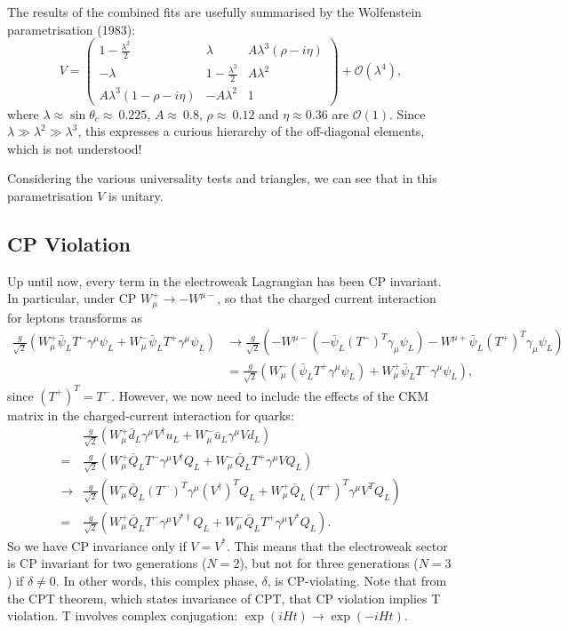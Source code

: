 The results of the combined fits are usefully summarised by the Wolfenstein parametrisation (1983):
\begin{equation}
V = \begin{pmatrix}
1-\frac{\lambda^2}{2} & \lambda & A\lambda^3(\rho - i\eta) \\
-\lambda &  1-\frac{\lambda^2}{2} & A \lambda^2\\
A\lambda^3(1-\rho-i\eta) & -A\lambda^2 & 1 
\end{pmatrix} + \mathcal{O}(\lambda^4),
\end{equation}
where $\lambda \approx \sin\theta_c \approx\ 0.225$, $A \approx\ 0.8$, $\rho \approx\ 0.12$ and $\eta \approx 0.36$ are $\mathcal{O}(1)$. Since $\lambda \gg \lambda^2 \gg \lambda^3$, this expresses a curious hierarchy of the off-diagonal elements, which is not understood! 

Considering the various universality tests and triangles, we can see that in this parametrisation $V$ is unitary.
%
\subsection{CP Violation}
%
Up until now, every term in the electroweak Lagrangian has been CP invariant. In particular, under CP $W_\mu^+ \to - W^{\mu -}$, so that the charged current interaction for leptons transforms as 
\begin{equation}
\begin{split}
\frac{g}{\sqrt{2}}(W_\mu^+\bar{\psi}_LT^-\gamma^\mu \psi_L + W_\mu^-\bar{\psi}_L T^+ \gamma^\mu \psi_L) &\to \frac{g}{\sqrt{2}}(-W^{\mu -}(-\bar{\psi}_L(T^-)^T \gamma_\mu \psi_L) - W^{\mu +}\bar{\psi}_L(T^+)^T \gamma_\mu \psi_L) \\
&= \frac{g}{\sqrt{2}}(W_\mu^- (\bar{\psi}_L T^+ \gamma^\mu \psi_L) + W_\mu^+ \bar{\psi}_L T^- \gamma^\mu \psi_L),
\end{split}
\end{equation}
since $(T^+)^T = T^-$. However, we now need to include the effects of the CKM matrix in the charged-current interaction for quarks:
\begin{equation}
\begin{split}
&\frac{g}{\sqrt{2}}(W_\mu^+\bar{d}_L\gamma^\mu V^\dagger u_L + W_\mu^-\bar{u}_L \gamma^\mu  V d_L)\\
= &\frac{g}{\sqrt{2}}(W_\mu^+\bar{Q}_L T^-\gamma^\mu V^\dagger Q_L + W_\mu^- \bar{Q}_L T^+ \gamma^\mu V Q_L)\\
\to &\frac{g}{\sqrt{2}}(W_\mu^-\bar{Q}_L (T^-)^T\gamma^\mu (V^\dagger)^T Q_L + W_\mu^+ \bar{Q}_L (T^+)^T \gamma^\mu V^T Q_L)\\
= &\frac{g}{\sqrt{2}}(W_\mu^+\bar{Q}_L T^-\gamma^\mu V^{*\dagger} Q_L + W_\mu^- \bar{Q}_L T^+ \gamma^\mu V^* Q_L).
\end{split}
\end{equation}
So we have CP invariance only if $V = V^*$. This means that the electroweak sector is CP invariant for two generations ($N=2$), but not for three generations ($N=3$) if $\delta \neq 0$. In other words, this complex phase, $\delta$, is CP-violating. Note that from the CPT theorem, which states invariance of CPT, that CP violation implies T violation. T involves complex conjugation: $\exp(iHt) \to \exp(-iHt)$.

